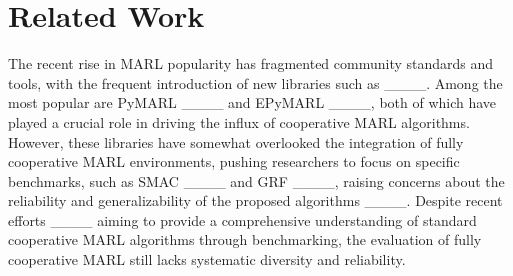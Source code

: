 \section{Related Work}
The recent rise in MARL popularity has fragmented community standards and tools, with the frequent introduction of new libraries such as ____. Among the most popular are PyMARL ____ and EPyMARL ____, both of which have played a crucial role in driving the influx of cooperative MARL algorithms. However, these libraries have somewhat overlooked the integration of fully cooperative MARL environments, pushing researchers to focus on specific benchmarks, such as SMAC ____ and GRF ____, raising concerns about the reliability and generalizability of the proposed algorithms ____. Despite recent efforts ____ aiming to provide a comprehensive understanding of standard cooperative MARL algorithms through benchmarking, the evaluation of fully cooperative MARL still lacks systematic diversity and reliability.